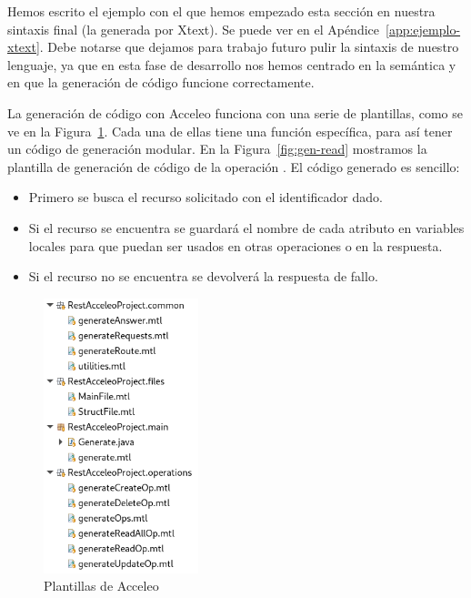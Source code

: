 \documentclass[runningheads]{llncs}
\begin{document}
Hemos escrito el ejemplo con el que hemos empezado esta sección en
nuestra sintaxis final (la generada por Xtext). Se puede ver en el
Apéndice~\ref{app:ejemplo-xtext}. Debe notarse que dejamos para trabajo
futuro pulir la sintaxis de nuestro lenguaje, ya que en esta fase de
desarrollo nos hemos centrado en la semántica y en que la generación
de código funcione correctamente.

La generación de código con Acceleo funciona con una serie de
plantillas, como se ve en la Figura~\ref{fig:acceleo-files}. Cada una
de ellas tiene una función específica, para así tener un código
de generación modular. En la Figura~\ref{fig:gen-read} mostramos la
plantilla de generación de código de la operación \READ. El código generado
es sencillo:

\begin{itemize}
    \item Primero se busca el recurso solicitado con el identificador dado.
    \item Si el recurso se encuentra se guardará el nombre de cada atributo
        en variables locales para que puedan ser usados en otras
        operaciones o en la respuesta.
    \item Si el recurso no se encuentra se devolverá la respuesta de fallo.
\end{itemize}

\begin{figure}
    \centering
    \includegraphics[width=0.4\textwidth]{acceleo-files}
    \caption{Plantillas de Acceleo}
    \label{fig:acceleo-files}
\end{figure}
\end{document}
